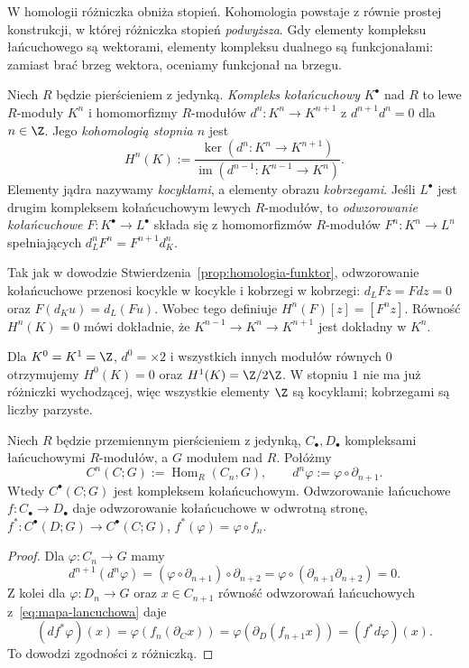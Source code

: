 W homologii różniczka obniża stopień.
Kohomologia powstaje z równie prostej
konstrukcji, w której różniczka stopień
\emph{podwyższa}. Gdy elementy kompleksu
łańcuchowego są wektorami, elementy
kompleksu dualnego są funkcjonałami:
zamiast brać brzeg wektora, oceniamy
funkcjonał na brzegu.

\begin{definicja}
\label{def:kohomologia-algebraiczna}
Niech $R$ będzie pierścieniem z jedynką.
\emph{Kompleks kołańcuchowy} $K^\bullet$ nad $R$ to
lewe $R$-moduły $K^n$ i homomorfizmy $R$-modułów
$d^n:K^n\to K^{n+1}$ z
$d^{n+1}d^n=0$ dla $n\in\Z$. Jego \emph{kohomologią stopnia $n$}
jest
\begin{equation}\label{eq:kohomologia-def}
 H^n(K):=\frac{\ker(d^n:K^n\to K^{n+1})}
 {\operatorname{im}(d^{n-1}:K^{n-1}\to K^n)}.
\end{equation}
Elementy jądra nazywamy \emph{kocyklami},
a elementy obrazu \emph{kobrzegami}.
Jeśli $L^\bullet$ jest drugim kompleksem
kołańcuchowym lewych $R$-modułów, to
\emph{odwzorowanie kołańcuchowe}
$F:K^\bullet\to L^\bullet$ składa się
z homomorfizmów $R$-modułów
$F^n:K^n\to L^n$ spełniających
$d_L^nF^n=F^{n+1}d_K^n$.
\end{definicja}

Tak jak w dowodzie
Stwierdzenia~\ref{prop:homologia-funktor},
odwzorowanie kołańcuchowe przenosi kocykle w
kocykle i kobrzegi w kobrzegi:
$d_LFz=Fdz=0$ oraz
$F(d_Ku)=d_L(Fu)$. Wobec tego definiuje
$H^n(F)[z]=[F^nz]$. Równość
$H^n(K)=0$ mówi dokładnie, że
$K^{n-1}\to K^n\to K^{n+1}$
jest dokładny w $K^n$.

\begin{przyklad}
Dla $K^0=K^1=\Z$, $d^0=\times2$
i wszystkich innych modułów równych $0$
otrzymujemy $H^0(K)=0$ oraz
$H^1(K)=\Z/2\Z$. W stopniu $1$ nie ma
już różniczki wychodzącej, więc
wszystkie elementy $\Z$ są kocyklami;
kobrzegami są liczby parzyste.
\end{przyklad}

\begin{stwierdzenie}
\label{prop:kompleks-dualny}
Niech $R$ będzie przemiennym pierścieniem z jedynką,
$C_\bullet,D_\bullet$ kompleksami łańcuchowymi
$R$-modułów, a $G$ modułem nad $R$. Połóżmy
\[
 C^n(C;G):=\operatorname{Hom}_R(C_n,G),
 \qquad d^n\varphi:=\varphi\circ \partial_{n+1}.
\]
Wtedy $C^\bullet(C;G)$ jest kompleksem
kołańcuchowym. Odwzorowanie łańcuchowe
$f:C_\bullet\to D_\bullet$ daje odwzorowanie
kołańcuchowe w odwrotną stronę,
$f^*:C^\bullet(D;G)\to C^\bullet(C;G)$,
$f^*(\varphi)=\varphi\circ f_n$.
\end{stwierdzenie}
\begin{proof}
Dla $\varphi:C_n\to G$ mamy
\[
 d^{n+1}(d^n\varphi)
 =(\varphi\circ \partial_{n+1})\circ \partial_{n+2}
 =\varphi\circ(\partial_{n+1}\partial_{n+2})=0.
\]
Z kolei dla $\varphi:D_n\to G$
oraz $x\in C_{n+1}$ równość odwzorowań łańcuchowych
z~\eqref{eq:mapa-lancuchowa} daje
\[
 (d f^*\varphi)(x)
 =\varphi(f_n(\partial_C x))
 =\varphi(\partial_D(f_{n+1}x))
 =(f^*d\varphi)(x).
\]
To dowodzi zgodności z różniczką.
\end{proof}

